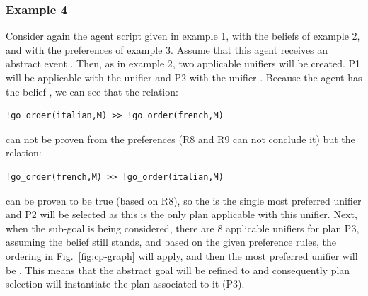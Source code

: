 \subsubsection*{Example 4}
Consider again the agent script given in example 1, with the beliefs of example 2, and with the preferences of example 3. Assume that this agent receives an abstract event . Then, as in example 2, two applicable unifiers will be created. P1 will be applicable with the unifier  and P2 with the unifier . Because the agent has the belief , we can see that the relation:
\begin{verbatim}
!go_order(italian,M) >> !go_order(french,M)
\end{verbatim}
can not be proven from the preferences (R8 and R9 can not conclude it) but the relation:
\begin{verbatim}
!go_order(french,M) >> !go_order(italian,M)
\end{verbatim}
can be proven to be true (based on R8), so
the  is the single most preferred unifier and P2 will be selected as this is the only plan applicable with this unifier. Next, when the sub-goal  is being considered, there are 8 applicable unifiers for plan P3, assuming the  belief still stands, and based on the given preference rules, the ordering in Fig.~\ref{fig:cp-graph} will apply, and then the most preferred unifier will be . This means that the abstract goal will be refined to  and consequently plan selection will instantiate the plan associated to it (P3).

